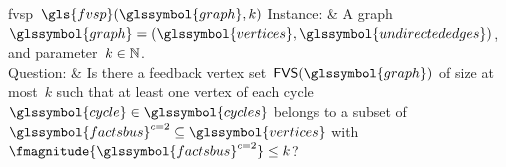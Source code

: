 %
\begin{problem}[framed]{\acrlong{fvsp}~$\gls{fvsp}(\glssymbol{graph},k)$}%
    Instance: & A graph~$\glssymbol{graph} = (\glssymbol{vertices},
    \glssymbol{undirectededges})$, and parameter~$k\in\mathbb{N}$.\\
    Question: & Is there a feedback vertex set~$\fvs(\glssymbol{graph})$ of
    size at most~$k$ such that at least one vertex of each
    cycle~$
    \glssymbol{cycle}
    \in
    \glssymbol{cycles}
    $ belongs to a subset of~$
    \glssymbol{factsbus}^{c = 2} 
    \subseteq 
    \glssymbol{vertices}
    $ with~$
    \fmagnitude{\glssymbol{factsbus}^{c = 2}} 
    \leq 
    k
    $?
\end{problem}%